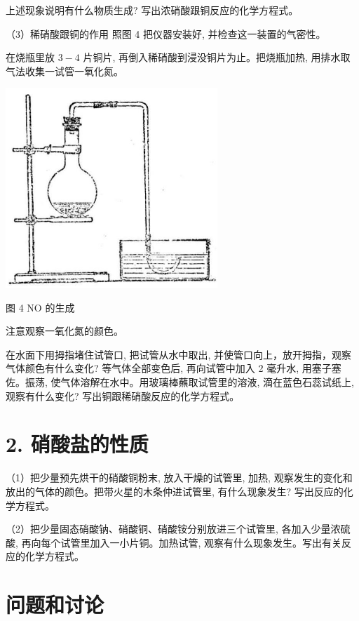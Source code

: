 \documentclass[10pt]{article}
\begin{document}
上述现象说明有什么物质生成? 写出浓硝酸跟铜反应的化学方程式。

（3）稀硝酸跟铜的作用 照图 4 把仪器安装好, 并检查这一装置的气密性。

在烧瓶里放 \(3 - 4\) 片铜片, 再倒入稀硝酸到浸没铜片为止。把烧瓶加热, 用排水取气法收集一试管一氧化氮。

\begin{center}
\includegraphics[max width=0.6\textwidth]{images/01912d13-9986-7822-a012-3f3f7be99dcb_214_381958.jpg}
\end{center}

图 4 NO 的生成

注意观察一氧化氮的颜色。

在水面下用拇指堵住试管口, 把试管从水中取出, 并使管口向上，放开拇指，观察气体颜色有什么变化? 等气体全部变色后, 再向试管中加入 2 毫升水, 用塞子塞佐。振荡, 使气体溶解在水中。用玻璃棒蘸取试管里的溶液, 滴在蓝色石蕊试纸上, 观察有什么变化? 写出铜跟稀硝酸反应的化学方程式。

\section*{2. 硝酸盐的性质}

（1）把少量预先烘干的硝酸铜粉末, 放入干燥的试管里, 加热, 观察发生的变化和放出的气体的颜色。把带火星的木条仲进试管里, 有什么现象发生? 写出反应的化学方程式。

（2）把少量固态硝酸钠、硝酸铜、硝酸铵分别放进三个试管里, 各加入少量浓硫酸, 再向每个试管里加入一小片铜。加热试管, 观察有什么现象发生。写出有关反应的化学方程式。

\section*{问题和讨论}
\end{document}
